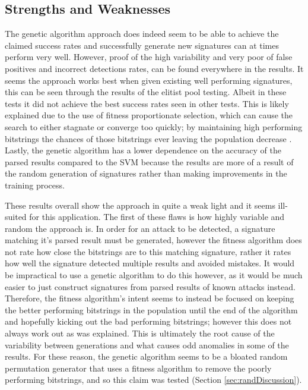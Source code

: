\subsection{Strengths and Weaknesses} \label{sec:genDisadvantages}

The genetic algorithm approach does indeed seem to be able to achieve the claimed success rates and successfully generate new signatures can at times perform very well.  However, proof of the high variability and very poor of false positives and incorrect detections rates, can be found everywhere in the results.  It seems the approach works best when given existing well performing signatures, this can be seen through the results of the elitist pool testing.  Albeit in these tests it did not achieve the best success rates seen in other tests.  This is likely explained due to the use of fitness proportionate selection, which can cause the search to either stagnate or converge too quickly; by maintaining high performing bitstrings the chances of those bitstrings ever leaving the population decrease \cite{selectionPressure}.  Lastly, the genetic algorithm has a lower dependence on the accuracy of the parsed results compared to the SVM because the results are more of a result of the random generation of signatures rather than making improvements in the training process.

These results overall show the approach in quite a weak light and it seems ill-suited for this application.  The first of these flaws is how highly variable and random the approach is.  In order for an attack to be detected, a signature matching it's parsed result must be generated, however the fitness algorithm does not rate how close the bitstrings are to this matching signature, rather it rates how well the signature detected multiple results and avoided mistakes.  It would be impractical to use a genetic algorithm to do this however, as it would be much easier to just construct signatures from parsed results of known attacks instead.  Therefore,  the fitness algorithm's intent seems to instead be focused on keeping the better performing bitstrings in the population until the end of the algorithm and hopefully kicking out the bad performing bitstrings; however this does not always work out as was explained.  This is ultimately the root cause of the variability between generations and what causes odd anomalies in some of the results.  For these reason, the genetic algorithm seems to be a bloated random permutation generator that uses a fitness algorithm to remove the poorly performing bitstrings, and so this claim was tested (Section \ref{sec:randDiscussion}).


